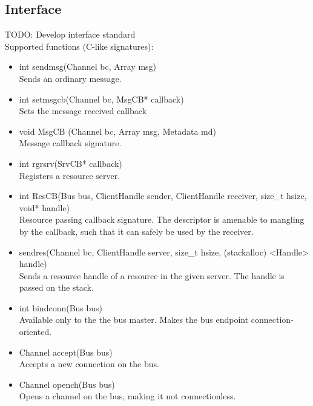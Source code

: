 \subsection{Interface}
TODO: Develop interface standard\\
Supported functions (C-like signatures):
\begin{itemize}
	\item int sendmsg(Channel bc, Array msg)\\
	Sends an ordinary message.
	\item int setmsgcb(Channel bc, MsgCB* callback)\\
	Sets the message received callback
	\item void MsgCB (Channel bc, Array msg, Metadata md)\\
	Message callback signature.
	\item int rgrsrv(SrvCB* callback)\\
	Registers a resource server.
	\item int ResCB(Bus bus, ClientHandle sender, ClientHandle receiver, size\_t hsize, void* handle)\\
	Resource passing callback signature. The descriptor is amenable to mangling by the callback, such that it can safely be used by the receiver.
	\item sendres(Channel bc, ClientHandle server, size\_t hsize, (stackalloc) <Handle> handle)\\
	Sends a resource handle of a resource in the given server. The handle is passed on the stack.
	\item int bindconn(Bus bus)\\
	Available only to the the bus master. Makes the bus endpoint connection-oriented.
	\item Channel accept(Bus bus)\\
	Accepts a new connection on the bus.
	\item Channel opench(Bus bus)\\
	Opens a channel on the bus, making it not connectionless.
\end{itemize}